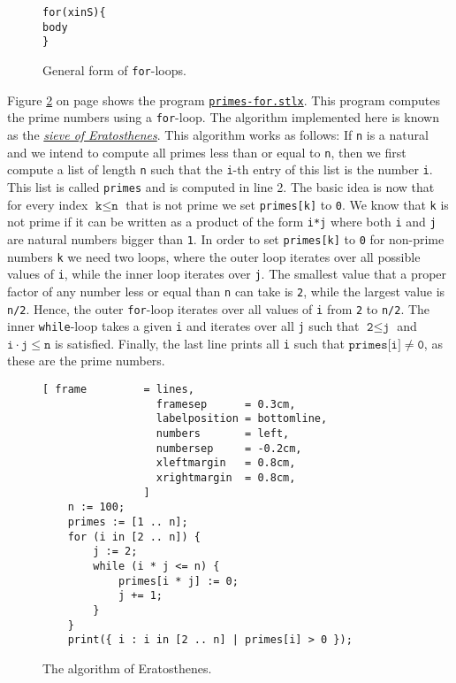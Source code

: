 \begin{figure}[!ht]
  \centering
\begin{alltt}
      for (x in S) \{
          body
      \}
\end{alltt}
\vspace*{-0.3cm}
\caption{General form of \texttt{for}-loops.}  \label{fig:for}
\end{figure} 

Figure  \ref{fig:primes-for.stlx} on page \pageref{fig:primes-for.stlx} shows the program
\href{https://github.com/karlstroetmann/Logik/blob/master/SetlX/primes-for.stlx}{\texttt{primes-for.stlx}}.
This program computes the prime numbers using a  \texttt{for}-loop.  The algorithm implemented here is known as
the \href{https://en.wikipedia.org/wiki/Sieve_of_Eratosthenes}{\emph{sieve of Eratosthenes}}.
This algorithm works as follows:  If \texttt{n} is a natural and we intend to compute all primes less than or
equal to \texttt{n}, then we first compute a list of length \texttt{n} such that the \texttt{i}-th entry of
this list is the number \texttt{i}.  This list is called \texttt{primes} and is computed in line 2.  The basic
idea is now that for every index $\texttt{k} \leq  \texttt{n}$ that is not prime we set \texttt{primes[k]} to
\texttt{0}.  We know that \texttt{k} is not prime if it can be written as a product of the form \texttt{i*j}
where both \texttt{i} and \texttt{j} are natural numbers bigger than \texttt{1}.
In order to set \texttt{primes[k]} to \texttt{0} for non-prime numbers \texttt{k} we need two loops,
where the outer loop iterates over all possible values of \texttt{i}, while the inner loop iterates
over \texttt{j}. The smallest value that a proper factor of any number less or equal than \texttt{n}
can take is \texttt{2}, while the largest value is \texttt{n/2}.  Hence,
the outer \texttt{for}-loop iterates over all values of \texttt{i} from \texttt{2} to \texttt{n/2}.
The inner \texttt{while}-loop takes a given \texttt{i} and iterates over all \texttt{j}
such that $\texttt{2} \leq \texttt{j}$ and $\texttt{i} \cdot \texttt{j} \leq \mathtt{n}$ is
satisfied.  Finally, the last line prints all \texttt{i} such that  $\texttt{primes[i]} \not= \mathtt{0}$, as these are
the prime numbers.


\begin{figure}[!ht]
  \centering
\begin{Verbatim}[ frame         = lines, 
                  framesep      = 0.3cm, 
                  labelposition = bottomline,
                  numbers       = left,
                  numbersep     = -0.2cm,
                  xleftmargin   = 0.8cm,
                  xrightmargin  = 0.8cm,
                ]
    n := 100;
    primes := [1 .. n];
    for (i in [2 .. n]) {
        j := 2;
        while (i * j <= n) {
            primes[i * j] := 0;
            j += 1;
        }
    }
    print({ i : i in [2 .. n] | primes[i] > 0 });
\end{Verbatim} 
\vspace*{-0.3cm}
\caption{The algorithm of Eratosthenes.}  \label{fig:primes-for.stlx}
\end{figure} 

